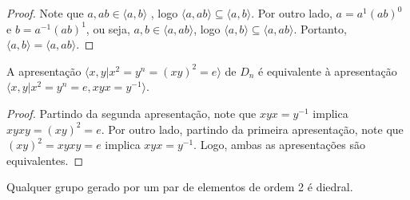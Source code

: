 	\begin{proof}
		Note que $a,ab\in\langle a,b \rangle$ , logo $\langle a,ab \rangle\subseteq \langle a,b \rangle$. 
		Por outro lado, $a=a^1(ab)^0$ e $b=a^{-1}(ab)^1$, ou seja, $a,b\in\langle a,ab \rangle$, 
		logo $\langle a,b \rangle \subseteq \langle a,ab \rangle$. Portanto, 
		$\langle a,b \rangle = \langle a,ab \rangle$.
	\end{proof}
	\begin{lemma}
	\label{lema diedral}
		A apresentação  $\langle x,y | x^2=y^n=(xy)^2=e \rangle$ de $D_n$ é equivalente à apresentação 
		$\langle x,y | x^2=y^n=e,xyx=y^{-1} \rangle$.
	\end{lemma}
	
	\begin{proof}
		Partindo da segunda apresentação, note que $xyx=y^{-1}$ implica $xyxy=(xy)^2=e$. Por outro lado, 
		partindo da primeira apresentação, note que $(xy)^2=xyxy=e$ implica $xyx=y^{-1}$. Logo, 
		ambas as apresentações são equivalentes.
	\end{proof}
	\begin{theorem}
		Qualquer grupo gerado por um par de elementos de ordem 2 é diedral. 
	\end{theorem}
